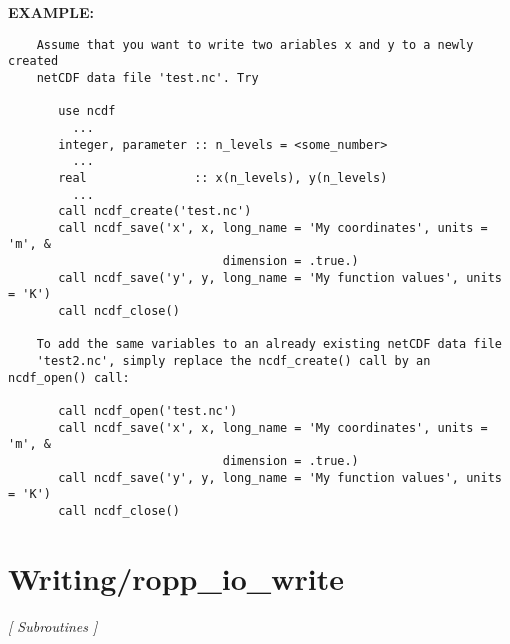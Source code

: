\textbf{EXAMPLE:}\hspace{0.08in}\begin{Verbatim}
    Assume that you want to write two ariables x and y to a newly created
    netCDF data file 'test.nc'. Try

       use ncdf
         ...
       integer, parameter :: n_levels = <some_number>
         ...
       real               :: x(n_levels), y(n_levels)
         ...
       call ncdf_create('test.nc')
       call ncdf_save('x', x, long_name = 'My coordinates', units = 'm', &
                              dimension = .true.)
       call ncdf_save('y', y, long_name = 'My function values', units = 'K')
       call ncdf_close()

    To add the same variables to an already existing netCDF data file 
    'test2.nc', simply replace the ncdf_create() call by an ncdf_open() call:

       call ncdf_open('test.nc')
       call ncdf_save('x', x, long_name = 'My coordinates', units = 'm', &
                              dimension = .true.)
       call ncdf_save('y', y, long_name = 'My function values', units = 'K')
       call ncdf_close()
\end{Verbatim}
\section{Writing/ropp\_io\_write}
\textsl{[ Subroutines ]}

